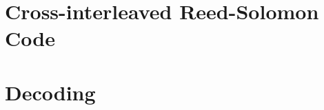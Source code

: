 \documentclass[../main.tex]{subfiles}
\begin{document}


    \section{Cross-interleaved Reed-Solomon Code}


    \section{Decoding}
\end{document}
